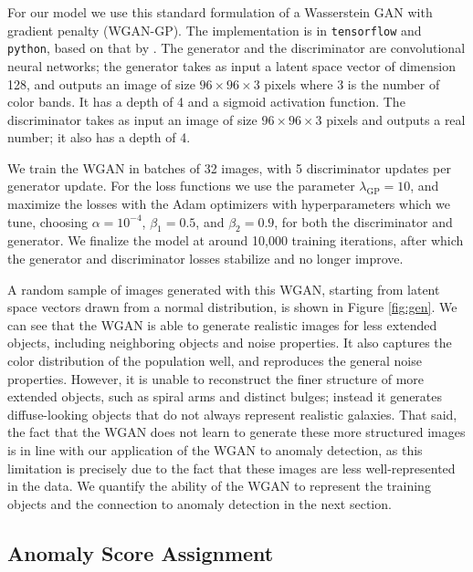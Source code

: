 For our model we use this standard formulation of a Wasserstein GAN with gradient penalty (WGAN-GP).
The implementation is in \texttt{tensorflow} and \texttt{python}, based on that by \cite{Gulrajani2017}.
The generator and the discriminator are convolutional neural networks; the generator takes as input a latent space vector of dimension 128, and outputs an image of size $96\times96\times3$ pixels where 3 is the number of color bands.
It has a depth of 4 and a sigmoid activation function.
The discriminator takes as input an image of size $96\times96\times3$ pixels and outputs a real number; it also has a depth of 4.

We train the WGAN in batches of 32 images, with 5 discriminator updates per generator update.
For the loss functions we use the parameter $\lambda_\text{GP}=10$, and maximize the losses with the Adam optimizers with hyperparameters which we tune, choosing $\alpha=10^{-4}$, $\beta_1=0.5$, and $\beta_2=0.9$, for both the discriminator and generator.
We finalize the model at around 10,000 training iterations, after which the generator and discriminator losses stabilize and no longer improve.

A random sample of images generated with this WGAN, starting from latent space vectors drawn from a normal distribution, is shown in Figure \ref{fig:gen}.
We can see that the WGAN is able to generate realistic images for less extended objects, including neighboring objects and noise properties.
It also captures the color distribution of the population well, and reproduces the general noise properties.
However, it is unable to reconstruct the finer structure of more extended objects, such as spiral arms and distinct bulges; instead it generates diffuse-looking objects that do not always represent realistic galaxies.
That said, the fact that the WGAN does not learn to generate these more structured images is in line with our application of the WGAN to anomaly detection, as this limitation is precisely due to the fact that these images are less well-represented in the data.
We quantify the ability of the WGAN to represent the training objects and the connection to anomaly detection in the next section.

\subsection{Anomaly Score Assignment}
\label{sec:sanom_assignment}


